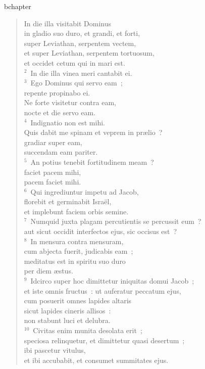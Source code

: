 bchapter\begin{verse}\vspace{-19pt}In die illa visitabit Dominus\\ in gladio suo duro, et grandi, et forti,\\ super Leviathan, serpentem vectem,\\ et super Leviathan, serpentem tortuosum,\\ et occidet cetum qui in mari est.\\
${}^{2}$~In die illa vinea meri cantabit ei.\\
${}^{3}$~Ego Dominus qui servo eam~;\\ repente propinabo ei.\\ Ne forte visitetur contra eam,\\ nocte et die servo eam.\\
${}^{4}$~Indignatio non est mihi.\\ Quis dabit me spinam et veprem in pr\ae lio~?\\ gradiar super eam,\\ succendam eam pariter.\\
${}^{5}$~An potius tenebit fortitudinem meam~?\\ faciet pacem mihi,\\ pacem faciet mihi.\\
${}^{6}$~Qui ingrediuntur impetu ad Jacob,\\ florebit et germinabit Isra\"el,\\ et implebunt faciem orbis semine.\\
${}^{7}$~Numquid juxta plagam percutientis se percussit eum~?\\ aut sicut occidit interfectos ejus, sic occisus est~?\\
${}^{8}$~In mensura contra mensuram,\\ cum abjecta fuerit, judicabis eam~;\\ meditatus est in spiritu suo duro\\ per diem \ae stus.\\
${}^{9}$~Idcirco super hoc dimittetur iniquitas domui Jacob~;\\ et iste omnis fructus~: ut auferatur peccatum ejus,\\ cum posuerit omnes lapides altaris\\ sicut lapides cineris allisos~:\\ non stabunt luci et delubra.\\
${}^{10}$~Civitas enim munita desolata erit~;\\ speciosa relinquetur, et dimittetur quasi desertum~;\\ ibi pascetur vitulus,\\ et ibi accubabit, et consumet summitates ejus.\\

\end{verse}
